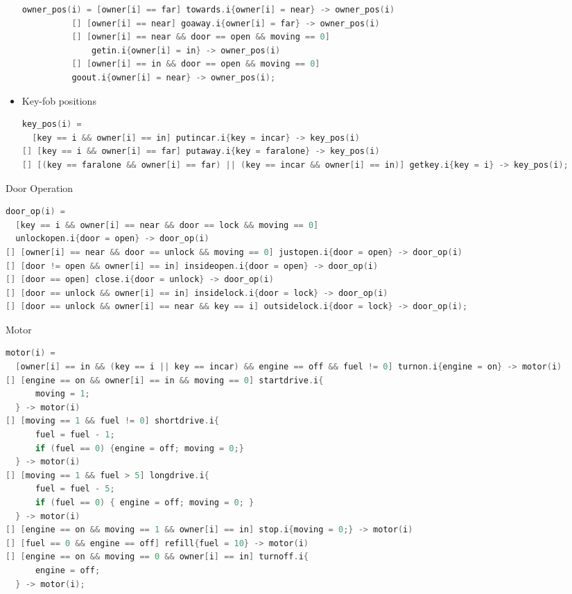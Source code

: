 \documentclass[10pt, landscape]{article}
\begin{document}
\begin{multicols*}{2}
\begin{itemize}
\begin{lstlisting}[language=C, basicstyle=\scriptsize\selectfont\ttfamily, mathescape]
owner_pos(i) = [owner[i] == far] towards.i{owner[i] = near} -> owner_pos(i)
          [] [owner[i] == near] goaway.i{owner[i] = far} -> owner_pos(i)
          [] [owner[i] == near && door == open && moving == 0] 
              getin.i{owner[i] = in} -> owner_pos(i)
          [] [owner[i] == in && door == open && moving == 0] 
          goout.i{owner[i] = near} -> owner_pos(i);
\end{lstlisting}
    \item Key-fob positions
\begin{lstlisting}[language=C, basicstyle=\scriptsize\selectfont\ttfamily, mathescape]
key_pos(i) = 
  [key == i && owner[i] == in] putincar.i{key = incar} -> key_pos(i)
[] [key == i && owner[i] == far] putaway.i{key = faralone} -> key_pos(i)
[] [(key == faralone && owner[i] == far) || (key == incar && owner[i] == in)] getkey.i{key = i} -> key_pos(i);
\end{lstlisting}
  \end{itemize}

  Door Operation
\begin{lstlisting}[language=C, basicstyle=\scriptsize\selectfont\ttfamily, mathescape]
door_op(i) =
  [key == i && owner[i] == near && door == lock && moving == 0] 
  unlockopen.i{door = open} -> door_op(i)
[] [owner[i] == near && door == unlock && moving == 0] justopen.i{door = open} -> door_op(i)
[] [door != open && owner[i] == in] insideopen.i{door = open} -> door_op(i)
[] [door == open] close.i{door = unlock} -> door_op(i)
[] [door == unlock && owner[i] == in] insidelock.i{door = lock} -> door_op(i)
[] [door == unlock && owner[i] == near && key == i] outsidelock.i{door = lock} -> door_op(i);
\end{lstlisting}

  Motor
\begin{lstlisting}[language=C, basicstyle=\scriptsize\selectfont\ttfamily, mathescape]
motor(i) =
  [owner[i] == in && (key == i || key == incar) && engine == off && fuel != 0] turnon.i{engine = on} -> motor(i)
[] [engine == on && owner[i] == in && moving == 0] startdrive.i{
      moving = 1;
  } -> motor(i)
[] [moving == 1 && fuel != 0] shortdrive.i{
      fuel = fuel - 1; 
      if (fuel == 0) {engine = off; moving = 0;}
  } -> motor(i)
[] [moving == 1 && fuel > 5] longdrive.i{
      fuel = fuel - 5; 
      if (fuel == 0) { engine = off; moving = 0; }
  } -> motor(i)
[] [engine == on && moving == 1 && owner[i] == in] stop.i{moving = 0;} -> motor(i)
[] [fuel == 0 && engine == off] refill{fuel = 10} -> motor(i)
[] [engine == on && moving == 0 && owner[i] == in] turnoff.i{
      engine = off;
  } -> motor(i);
\end{lstlisting}


\end{multicols*}
\end{document}
